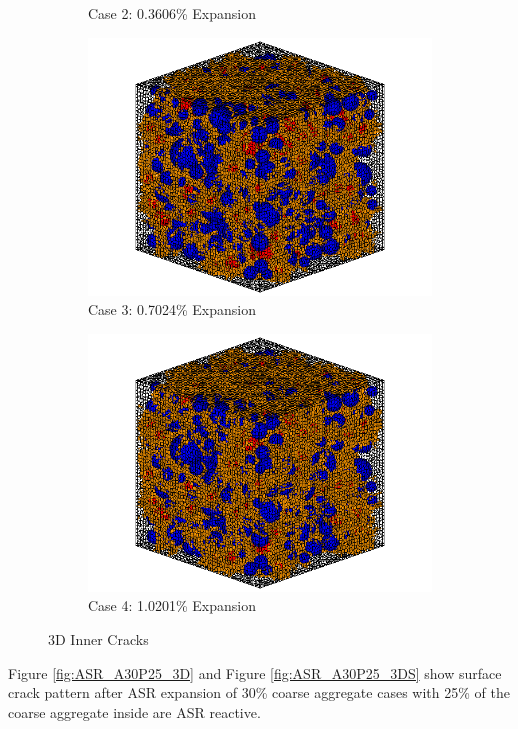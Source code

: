 \begin{figure}[!h]
\begin{subfigure}{.5\textwidth}
    \caption{Case 2: 0.3606\% Expansion}
    \end{subfigure}%
    \begin{subfigure}{.5\textwidth}
      \centering
      \includegraphics[width=.8\linewidth]{Files/exp_3D/ASR/A30P25_3_c.png}
    \caption{Case 3: 0.7024\% Expansion}
    \end{subfigure}
    \begin{subfigure}{.5\textwidth}
      \centering
      \includegraphics[width=.8\linewidth]{Files/exp_3D/ASR/A30P25_4_c.png}
    \caption{Case 4: 1.0201\% Expansion}
    \end{subfigure}%


  \caption{3D Inner Cracks}
  \label{fig:ASR_A30P25_crack}
\end{figure}

Figure \ref{fig:ASR_A30P25_3D} and Figure \ref{fig:ASR_A30P25_3DS} show surface crack pattern after ASR expansion of 30\% coarse aggregate cases with 25\% of the coarse aggregate inside are ASR reactive.

